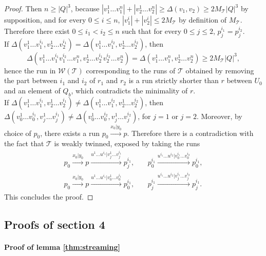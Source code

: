 \documentclass[envcountsame]{llncs}
\newcommand\tra{\mathcal{T}}
\begin{document}
\begin{proof}
Then $n \geq |Q|^3$, because $|v_1^{1} \ldots v_1^{n}| + |v_2^{1} \ldots v_2^{n}| \geq \Delta(v_1,v_2) \geq 2 M_{\tra} |Q|^3$ by supposition, and for every $0 \leq i \leq n$, $|v_1^{i}| + |v_2^i| \leq 2 M_{\tra}$ by definition of $M_{\tra}$.
Therefore there exist $0 \leq i_1<i_2 \leq n$ such that for every $0 \leq j \leq 2$, $p_j^{i_1} = p_j^{i_2}$.\\
If $\Delta(v_1^{1} \ldots v_1^{i_1},v_2^{1} \ldots v_2^{i_1}) = \Delta(v_1^{1} \ldots v_1^{i_2},v_2^{1} \ldots v_2^{i_2})$, then 
$$\Delta(v_1^{1} \ldots v_1^{i_1}v_1^{i_2} \ldots v_1^{n},v_2^{1} \ldots v_2^{i_1}v_2^{i_2} \ldots v_2^{n}) = \Delta(v_1^{1} \ldots v_1^{n},v_2^{1} \ldots v_2^{n}) \geq  2M_{\tra} |Q|^3,$$
hence the run in $\mathcal{W}(\tra)$ corresponding to the runs of $\tra$ obtained by removing the part between $i_1$ and $i_2$ of $r_1$ and $r_2$ is a run strictly shorter than $r$ between $U_0$ and an element of $Q_b$, which contradicts the minimality of $r$.\\
If $\Delta(v_1^{1} \ldots v_1^{i_1},v_2^{1} \ldots v_2^{i_1}) \neq \Delta(v_1^{1} \ldots v_1^{i_2},v_2^{1} \ldots v_2^{i_2})$, then $\Delta(v_0^{1} \ldots v_0^{i_1},v_j^{1} \ldots v_j^{i_1}) \neq \Delta(v_0^{1} \ldots v_0^{i_2},v_j^{1} \ldots v_j^{i_2})$, for $j = 1$ or $j = 2$.
Moreover, by choice of $p_0$, there exists a run $p_0 \xrightarrow{x_0|y_0} p$.
Therefore there is a contradiction with the fact that $\tra$ is weakly twinned, exposed by taking the runs
$$\begin{array}{llll}
p_0 \xrightarrow{x_0|y_0} p \xrightarrow{u^{1} \ldots u^{i_1}|v_j^{1} \ldots v_j^{i_1}} p_j^{i_1}, & \ & p_0^{i_1}  \xrightarrow{u^{i_1} \ldots u^{i_2}|v_0^{i_1} \ldots v_0^{i_2}} p_0^{i_1},\\
p_0 \xrightarrow{x_0|y_0} p \xrightarrow{u^{1} \ldots u^{i_1}|v_0^{1} \ldots v_0^{i_1}} p_0^{i_1}, & \ & p_j^{i_1} \xrightarrow{u^{i_1} \ldots u^{i_2}|v_j^{i_1} \ldots v_j^{i_2}} p_j^{i_1}.
\end{array}$$
This concludes the proof.
\end{proof}

\subsection*{Proofs of section 4}

\paragraph{Proof of lemma \ref{thm:streaming}}
\end{document}
